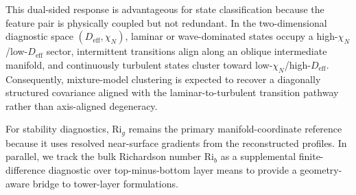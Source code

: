 This dual-sided response is advantageous for state classification because the feature pair is physically coupled but not redundant. In the two-dimensional diagnostic space $(D_{\mathrm{eff}}, \chi_N)$, laminar or wave-dominated states occupy a high-$\chi_N$/low-$D_{\mathrm{eff}}$ sector, intermittent transitions align along an oblique intermediate manifold, and continuously turbulent states cluster toward low-$\chi_N$/high-$D_{\mathrm{eff}}$. Consequently, mixture-model clustering is expected to recover a diagonally structured covariance aligned with the laminar-to-turbulent transition pathway rather than axis-aligned degeneracy.

For stability diagnostics, $\mathrm{Ri}_g$ remains the primary manifold-coordinate reference because it uses resolved near-surface gradients from the reconstructed profiles. In parallel, we track the bulk Richardson number $\mathrm{Ri}_b$ as a supplemental finite-difference diagnostic over top-minus-bottom layer means to provide a geometry-aware bridge to tower-layer formulations.